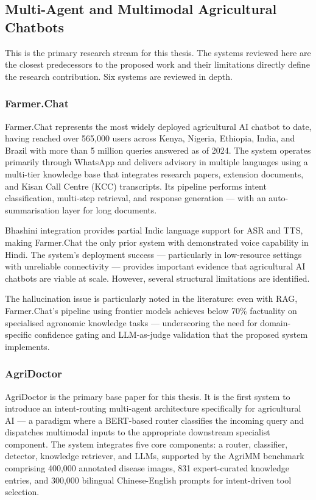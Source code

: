 \documentclass[12pt,a4paper]{article}
\begin{document}
\subsection{Multi-Agent and Multimodal Agricultural Chatbots}
This is the primary research stream for this thesis. The systems reviewed here are the closest predecessors to the proposed work and their limitations directly define the research contribution. Six systems are reviewed in depth.

\subsubsection{Farmer.\allowbreak Chat \cite{farmerchat2024}}
Farmer.\allowbreak Chat represents the most widely deployed agricultural AI chatbot to date, having reached over 565,000 users across Kenya, Nigeria, Ethiopia, India, and Brazil with more than 5 million queries answered as of 2024. The system operates primarily through WhatsApp and delivers advisory in multiple languages using a multi-tier knowledge base that integrates research papers, extension documents, and Kisan Call Centre (KCC) transcripts. Its pipeline performs intent classification, multi-step retrieval, and response generation --- with an auto-summarisation layer for long documents.

Bhashini integration provides partial Indic language support for ASR and TTS, making Farmer.\allowbreak Chat the only prior system with demonstrated voice capability in Hindi. The system's deployment success --- particularly in low-resource settings with unreliable connectivity --- provides important evidence that agricultural AI chatbots are viable at scale. However, several structural limitations are identified.


The hallucination issue is particularly noted in the literature: even with RAG, Farmer.\allowbreak Chat's pipeline using frontier models achieves below 70\% factuality on specialised agronomic knowledge tasks --- underscoring the need for domain-specific confidence gating and LLM-as-judge validation that the proposed system implements.

\subsubsection{AgriDoctor \cite{agridoctor2025}}
AgriDoctor is the primary base paper for this thesis. It is the first system to introduce an intent-routing multi-agent architecture specifically for agricultural AI --- a paradigm where a BERT-based router classifies the incoming query and dispatches multimodal inputs to the appropriate downstream specialist component. The system integrates five core components: a router, classifier, detector, knowledge retriever, and LLMs, supported by the AgriMM benchmark comprising 400,000 annotated disease images, 831 expert-curated knowledge entries, and 300,000 bilingual Chinese-English prompts for intent-driven tool selection.
\end{document}
